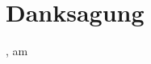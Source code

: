 
\chapter*{Danksagung}%

\vspace{1.5cm}%

\begin{center}%
\raggedleft{\campusAuthor}%
\end{center}%

\vspace{1.5cm}%

\campusCity, am \campusDate%
